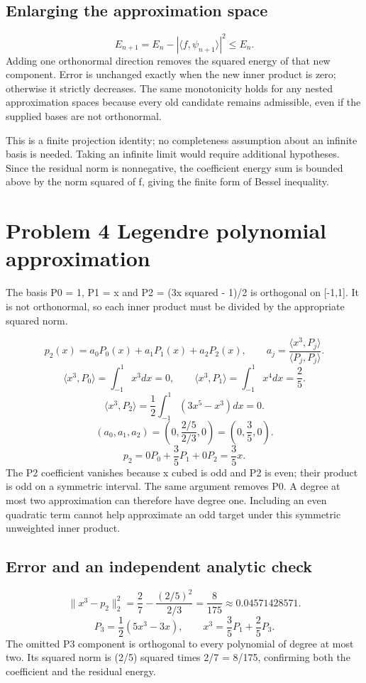 \documentclass[a4paper,11pt]{article}
\begin{document}
\subsection*{Enlarging the approximation space}
\[E_{n+1}=E_n-|\langle f,\psi_{n+1}\rangle|^2\leq E_n.\]
Adding one orthonormal direction removes the squared energy of that new component. Error is unchanged exactly when the new inner product is zero; otherwise it strictly decreases. The same monotonicity holds for any nested approximation spaces because every old candidate remains admissible, even if the supplied bases are not orthonormal.

This is a finite projection identity; no completeness assumption about an infinite basis is needed. Taking an infinite limit would require additional hypotheses. Since the residual norm is nonnegative, the coefficient energy sum is bounded above by the norm squared of f, giving the finite form of Bessel inequality.

\clearpage
\section*{Problem 4 Legendre polynomial approximation}
The basis P0 = 1, P1 = x and P2 = (3x squared - 1)/2 is orthogonal on [-1,1]. It is not orthonormal, so each inner product must be divided by the appropriate squared norm.

\[p_2(x)=a_0P_0(x)+a_1P_1(x)+a_2P_2(x),\qquad a_j=\frac{\langle x^3,P_j\rangle}{\langle P_j,P_j\rangle}.\]
\[\langle x^3,P_0\rangle=\int_{-1}^1x^3dx=0,\qquad \langle x^3,P_1\rangle=\int_{-1}^1x^4dx=\frac25.\]
\[\langle x^3,P_2\rangle=\frac12\int_{-1}^1(3x^5-x^3)dx=0.\]
\[(a_0,a_1,a_2)=\left(0,\frac{2/5}{2/3},0\right)=\left(0,\frac35,0\right).\]
\[p_2=0P_0+\frac35P_1+0P_2=\frac35x.\]
The P2 coefficient vanishes because x cubed is odd and P2 is even; their product is odd on a symmetric interval. The same argument removes P0. A degree at most two approximation can therefore have degree one. Including an even quadratic term cannot help approximate an odd target under this symmetric unweighted inner product.

\subsection*{Error and an independent analytic check}
\[\|x^3-p_2\|_2^2=\frac27-\frac{(2/5)^2}{2/3}=\frac8{175}\approx0.04571428571.\]
\[P_3=\frac12(5x^3-3x),\qquad x^3=\frac35P_1+\frac25P_3.\]
The omitted P3 component is orthogonal to every polynomial of degree at most two. Its squared norm is (2/5) squared times 2/7 = 8/175, confirming both the coefficient and the residual energy.
\end{document}
